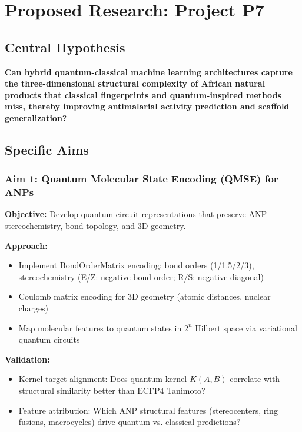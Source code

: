 \documentclass[11pt,a4paper]{article}
\begin{document}
\section{Proposed Research: Project P7}

\subsection{Central Hypothesis}

\textbf{Can hybrid quantum-classical machine learning architectures capture the three-dimensional structural complexity of African natural products that classical fingerprints and quantum-inspired methods miss, thereby improving antimalarial activity prediction and scaffold generalization?}

\subsection{Specific Aims}

\subsubsection{Aim 1: Quantum Molecular State Encoding (QMSE) for ANPs}

\textbf{Objective:} Develop quantum circuit representations that preserve ANP stereochemistry, bond topology, and 3D geometry.

\textbf{Approach:}
\begin{itemize}
    \item Implement BondOrderMatrix encoding: bond orders (1/1.5/2/3), stereochemistry (E/Z: negative bond order; R/S: negative diagonal)
    \item Coulomb matrix encoding for 3D geometry (atomic distances, nuclear charges)
    \item Map molecular features to quantum states in $2^n$ Hilbert space via variational quantum circuits
\end{itemize}

\textbf{Validation:}
\begin{itemize}
    \item Kernel target alignment: Does quantum kernel $K(A,B)$ correlate with structural similarity better than ECFP4 Tanimoto?
    \item Feature attribution: Which ANP structural features (stereocenters, ring fusions, macrocycles) drive quantum vs. classical predictions?
\end{itemize}
\end{document}
